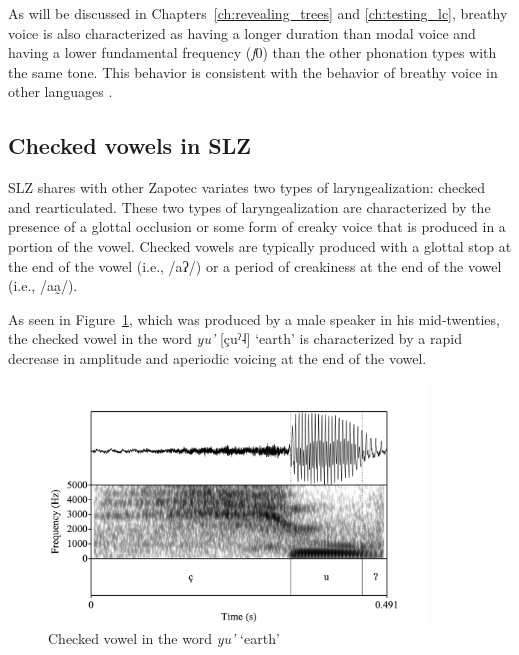 As will be discussed in Chapters~\ref{ch:revealing_trees} and \ref{ch:testing_lc}, breathy voice is also characterized as having a longer duration than modal voice and having a lower fundamental frequency (\textit{f}0) than the other phonation types with the same tone. This behavior is consistent with the behavior of breathy voice in other languages \citep[e.g.,][]{blankenshipTimeCourseBreathiness1997,brunelleDialectExperiencePerceptual2012,brunelleTonePhonationSoutheast2016,hillenbrandAcousticCorrelatesBreathy1996}.

\subsection{Checked vowels in SLZ} \label{sec:SLZ-voicequality-checked}
SLZ shares with other Zapotec variates two types of laryngealization: checked and rearticulated. These two types of laryngealization are characterized by the presence of a glottal occlusion or some form of creaky voice that is produced in a portion of the vowel. Checked vowels are typically produced with a glottal stop at the end of the vowel (i.e., /aʔ/) or a period of creakiness at the end of the vowel (i.e., /aa̰/). 

As seen in Figure~\ref{fig:CheckedVowel}, which was produced by a male speaker in his mid-twenties, the checked vowel in the word \textit{yu'} [çuˀ˨] `earth' is characterized by a rapid decrease in amplitude and aperiodic voicing at the end of the vowel. 

\begin{figure}[h!]
    \centering
    \includegraphics[width=0.9\textwidth]{images/Spectrograms/RD_yu'.png}
    \caption{Checked vowel in the word \textit{yu'} `earth'}
    \label{fig:CheckedVowel}
\end{figure}

